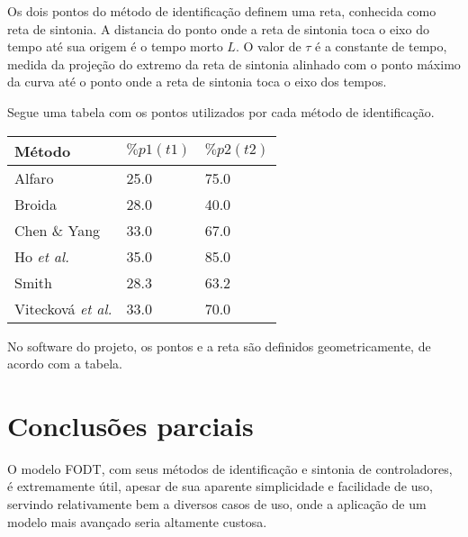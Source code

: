     Os dois pontos do método de identificação definem uma reta, conhecida
    como reta de sintonia. A distancia do ponto onde a reta de sintonia
    toca o eixo do tempo até sua origem é o tempo morto $L$. O valor de $\tau$
    é a constante de tempo, medida da projeção do extremo da reta de sintonia
    alinhado com o ponto máximo da curva até o ponto onde a reta de sintonia
    toca o eixo dos tempos.
    
    Segue uma tabela com os pontos utilizados por cada método de identificação.
    
    \begin{center}
        \begin{tabular}{l l l}
Método & $\%p1(t1)$ & $\%p2(t2)$ \\
\hline
Alfaro                    & 25.0 & 75.0 \\
Broida                    & 28.0 & 40.0 \\
Chen \& Yang              & 33.0 & 67.0 \\
Ho \textit{et al.}        & 35.0 & 85.0 \\
Smith                     & 28.3 & 63.2 \\
Vitecková \textit{et al.} & 33.0 & 70.0 \\
        \end{tabular}
    \end{center}
    
    No software do projeto, os pontos e a reta são definidos geometricamente,
    de acordo com a tabela.    

\section{Conclusões parciais}

    O modelo \acs{FODT}, com seus métodos de identificação e sintonia de
    controladores, é extremamente útil, apesar de sua aparente simplicidade e
    facilidade de uso, servindo relativamente bem a diversos casos de uso, onde
    a aplicação de um modelo mais avançado seria altamente custosa.
